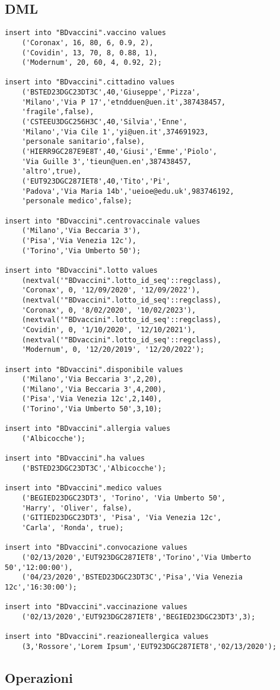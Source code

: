 \documentclass[11pt]{article}
\begin{document}
\subsection{DML}
\label{sec:org9a26ab7}
\lstset{language=SQL,label= ,caption= ,captionpos=b,numbers=none}
\begin{lstlisting}
insert into "BDvaccini".vaccino values
	('Coronax', 16, 80, 6, 0.9, 2),
	('Covidin', 13, 70, 8, 0.88, 1),
	('Modernum', 20, 60, 4, 0.92, 2);

insert into "BDvaccini".cittadino values
	('BSTED23DGC23DT3C',40,'Giuseppe','Pizza',
    'Milano','Via P 17','etndduen@uen.it',387438457,
    'fragile',false),
	('CSTEEU3DGC256H3C',40,'Silvia','Enne',
    'Milano','Via Cile 1','yi@uen.it',374691923,
    'personale sanitario',false),
	('HIERR9GC287E9E8T',40,'Giusi','Emme','Piolo',
    'Via Guille 3','tieun@uen.en',387438457,
    'altro',true),
	('EUT923DGC287IET8',40,'Tito','Pi',
    'Padova','Via Maria 14b','ueioe@edu.uk',983746192,
    'personale medico',false);

insert into "BDvaccini".centrovaccinale values
	('Milano','Via Beccaria 3'),
	('Pisa','Via Venezia 12c'),
	('Torino','Via Umberto 50');

insert into "BDvaccini".lotto values
	(nextval('"BDvaccini".lotto_id_seq'::regclass),
    'Coronax', 0, '12/09/2020', '12/09/2022'),
	(nextval('"BDvaccini".lotto_id_seq'::regclass),
    'Coronax', 0, '8/02/2020', '10/02/2023'),
	(nextval('"BDvaccini".lotto_id_seq'::regclass),
    'Covidin', 0, '1/10/2020', '12/10/2021'),
	(nextval('"BDvaccini".lotto_id_seq'::regclass),
    'Modernum', 0, '12/20/2019', '12/20/2022');

insert into "BDvaccini".disponibile values
	('Milano','Via Beccaria 3',2,20),
	('Milano','Via Beccaria 3',4,200),
	('Pisa','Via Venezia 12c',2,140),
	('Torino','Via Umberto 50',3,10);

insert into "BDvaccini".allergia values
	('Albicocche');

insert into "BDvaccini".ha values
	('BSTED23DGC23DT3C','Albicocche');

insert into "BDvaccini".medico values
	('BEGIED23DGC23DT3', 'Torino', 'Via Umberto 50',
    'Harry', 'Oliver', false),
	('GITIED23DGC23DT3', 'Pisa', 'Via Venezia 12c',
    'Carla', 'Ronda', true);

insert into "BDvaccini".convocazione values
	('02/13/2020','EUT923DGC287IET8','Torino','Via Umberto 50','12:00:00'),
	('04/23/2020','BSTED23DGC23DT3C','Pisa','Via Venezia 12c','16:30:00');

insert into "BDvaccini".vaccinazione values
	('02/13/2020','EUT923DGC287IET8','BEGIED23DGC23DT3',3);

insert into "BDvaccini".reazioneallergica values
	(3,'Rossore','Lorem Ipsum','EUT923DGC287IET8','02/13/2020');
\end{lstlisting}
\subsection{Operazioni}
\label{sec:orgfd6c104}
\end{document}
